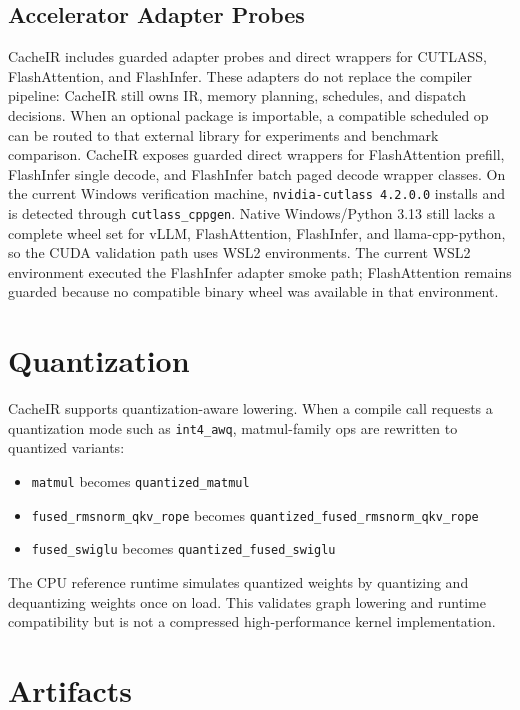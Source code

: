 \documentclass[11pt]{article}
\begin{document}
\subsection{Accelerator Adapter Probes}

CacheIR includes guarded adapter probes and direct wrappers for CUTLASS,
FlashAttention, and FlashInfer. These adapters do not replace the compiler
pipeline: CacheIR still owns IR, memory planning, schedules, and dispatch
decisions. When an optional package is importable, a compatible scheduled op can
be routed to that external library for experiments and benchmark comparison.
CacheIR exposes guarded direct wrappers for FlashAttention prefill, FlashInfer
single decode, and FlashInfer batch paged decode wrapper classes. On the current
Windows verification machine, \texttt{nvidia-cutlass 4.2.0.0} installs and is
detected through \texttt{cutlass\_cppgen}. Native Windows/Python 3.13 still lacks
a complete wheel set for vLLM, FlashAttention, FlashInfer, and llama-cpp-python,
so the CUDA validation path uses WSL2 environments. The current WSL2 environment
executed the FlashInfer adapter smoke path; FlashAttention remains guarded
because no compatible binary wheel was available in that environment.

\section{Quantization}

CacheIR supports quantization-aware lowering. When a compile call requests a
quantization mode such as \texttt{int4\_awq}, matmul-family ops are rewritten to
quantized variants:

\begin{itemize}[leftmargin=*]
  \item \texttt{matmul} becomes \texttt{quantized\_matmul}
  \item \texttt{fused\_rmsnorm\_qkv\_rope} becomes
        \texttt{quantized\_fused\_rmsnorm\_qkv\_rope}
  \item \texttt{fused\_swiglu} becomes \texttt{quantized\_fused\_swiglu}
\end{itemize}

The CPU reference runtime simulates quantized weights by quantizing and
dequantizing weights once on load. This validates graph lowering and runtime
compatibility but is not a compressed high-performance kernel implementation.

\section{Artifacts}
\end{document}

